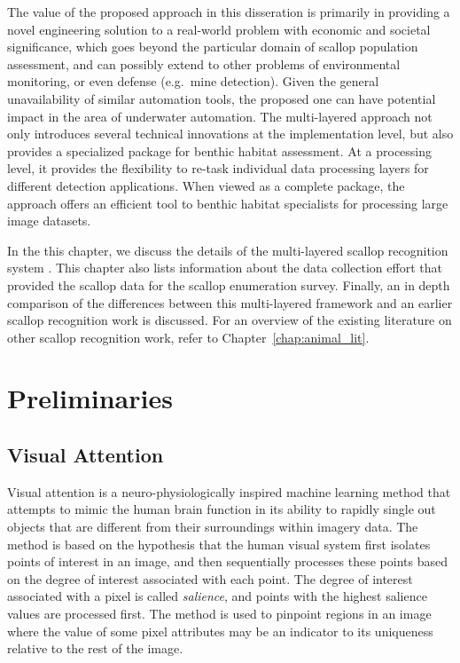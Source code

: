 The value of the proposed approach in this disseration is primarily in  providing a novel engineering solution to a real-world problem with economic
and societal significance, which goes beyond the particular domain of scallop population
assessment, and can possibly extend to other problems of environmental monitoring,
or even defense (e.g.\ mine detection).  
Given the general unavailability of similar automation tools, the proposed one
can have potential impact in the area of underwater automation.  
The multi-layered approach not only introduces several technical innovations at 
the implementation level, 
but also provides a specialized package for benthic habitat assessment. 
At a processing level, it provides the flexibility to re-task individual 
data processing layers for different detection applications.
When viewed as a complete package, the approach
offers an efficient tool to benthic habitat specialists for processing 
large image datasets.

In the this chapter, we discuss the details of the multi-layered scallop recognition system  
\cite{prasanna_med, prasanna_aslo, prasanna_igi}. This chapter also lists information about the data collection effort that provided the scallop data for the scallop enumeration survey. Finally, an in depth comparison of the differences between this multi-layered framework and an earlier scallop recognition work \cite{dawkings13} is discussed. For an overview of the existing literature on other scallop recognition work, refer to Chapter~\ref{chap:animal_lit}.

\section{Preliminaries}

\subsection{Visual Attention}
\label{sec:visual_attn}

Visual attention is a neuro-physiologically inspired machine learning method \cite{koch}
that attempts to mimic the human brain function in its ability to rapidly single out
objects that are different from their surroundings within imagery data.
The method is based on the hypothesis that the human visual system first isolates 
points of interest in an image, and then sequentially processes these points 
based on the degree of interest associated with each point.
The degree of interest associated with a pixel is called \emph{salience},
and points with the highest salience values are processed first.
The method is used to pinpoint 
regions in an image where the value of some pixel attributes may be an indicator to
its uniqueness relative to the rest of the image.  

